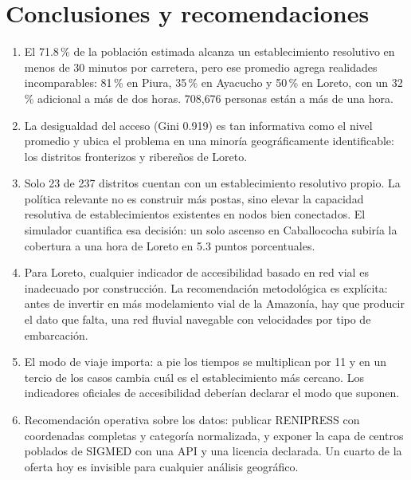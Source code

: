 \documentclass[11pt,a4paper]{article}
\begin{document}
\section{Conclusiones y recomendaciones}

\begin{enumerate}[leftmargin=1.4em]
\item El 71.8\,\% de la población estimada alcanza un establecimiento
resolutivo en menos de 30 minutos por carretera, pero ese promedio agrega
realidades incomparables: 81\,\% en Piura, 35\,\% en Ayacucho y 50\,\% en
Loreto, con un 32\,\% adicional a más de dos horas. 708{,}676 personas están a
más de una hora.

\item La desigualdad del acceso (Gini 0.919) es tan informativa como el nivel
promedio y ubica el problema en una minoría geográficamente identificable: los
distritos fronterizos y ribereños de Loreto.

\item Solo 23 de 237 distritos cuentan con un establecimiento resolutivo
propio. La política relevante no es construir más postas, sino elevar la
capacidad resolutiva de establecimientos existentes en nodos bien conectados.
El simulador cuantifica esa decisión: un solo ascenso en Caballococha subiría
la cobertura a una hora de Loreto en 5.3 puntos porcentuales.

\item Para Loreto, cualquier indicador de accesibilidad basado en red vial es
inadecuado por construcción. La recomendación metodológica es explícita: antes
de invertir en más modelamiento vial de la Amazonía, hay que producir el dato
que falta, una red fluvial navegable con velocidades por tipo de embarcación.

\item El modo de viaje importa: a pie los tiempos se multiplican por 11 y en un
tercio de los casos cambia cuál es el establecimiento más cercano. Los
indicadores oficiales de accesibilidad deberían declarar el modo que suponen.

\item Recomendación operativa sobre los datos: publicar RENIPRESS con
coordenadas completas y categoría normalizada, y exponer la capa de centros
poblados de SIGMED con una API y una licencia declarada. Un cuarto de la
oferta hoy es invisible para cualquier análisis geográfico.
\end{enumerate}
\end{document}
